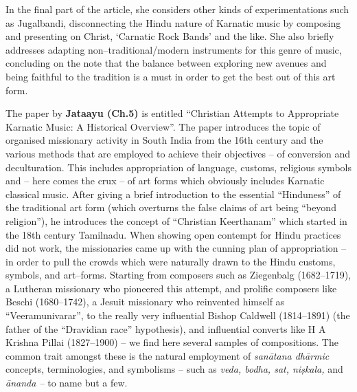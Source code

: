 In the final part of the article, she considers other kinds of experimentations such as Jugalbandi, disconnecting the Hindu nature of Karnatic music by composing and presenting on Christ, ‘Carnatic Rock Bands’ and the like. She also briefly addresses adapting non–traditional/modern instruments for this genre of music, concluding on the note that the balance between exploring new avenues and being faithful to the tradition is a must in order to get the best out of this art form.

The paper by \textbf{Jataayu (Ch.5)} is entitled “Christian Attempts to Appropriate Karnatic Music: A Historical Overview”. The paper introduces the topic of organised missionary activity in South India from the 16th century and the various methods that are employed to achieve their objectives – of conversion and deculturation. This includes appropriation of language, customs, religious symbols and – here comes the crux – of art forms which obviously includes Karnatic classical music. After giving a brief introduction to the essential “Hinduness” of the traditional art form (which overturns the false claims of art being “beyond religion”), he introduces the concept of “Christian Keerthanam” which started in the 18th century Tamilnadu. When showing open contempt for Hindu practices did not work, the missionaries came up with the cunning plan of appropriation – in order to pull the crowds which were naturally drawn to the Hindu customs, symbols, and art–forms. Starting from composers such as Ziegenbalg (1682–1719), a Lutheran missionary who pioneered this attempt, and prolific composers like Beschi (1680–1742), a Jesuit missionary who reinvented himself as “Veeramunivarar”, to the really very influential Bishop Caldwell (1814–1891) (the father of the “Dravidian race” hypothesis), and influential converts like H A Krishna Pillai (1827–1900) – we find here several samples of compositions. The common trait amongst these is the natural employment of \textit{sanātana dhārmic} concepts, terminologies, and symbolisms – such as \textit{veda, bodha, sat, niṣkala,} and \textit{ānanda –} to name but a few.

